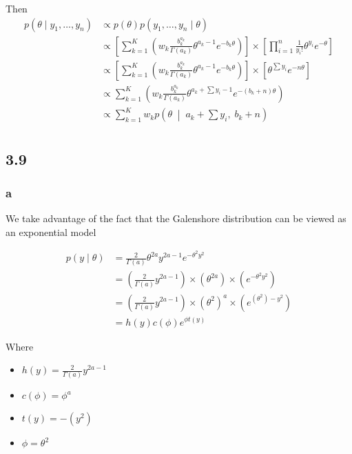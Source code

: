 \documentclass[]{article}
\providecommand{\tightlist}{%
  \setlength{\itemsep}{0pt}\setlength{\parskip}{0pt}}
\begin{document}
Then \begin{align}
p(\theta \mid y_1, \dots, y_n) &\propto p(\theta) p(y_1, \dots, y_n \mid \theta) \\
&\propto \left[ \sum_{k = 1}^K \left( w_k \frac{b_k^{a_k}}{\Gamma(a_k)} \theta^{a_k - 1} e^{-b_k \theta} \right) \right] \times \left[ \prod_{i = 1}^n \frac{1}{y_i !} \theta^{y_i} e^{-\theta} \right] \\
&\propto \left[ \sum_{k = 1}^K \left( w_k \frac{b_k^{a_k}}{\Gamma(a_k)} \theta^{a_k - 1} e^{-b_k \theta} \right) \right] \times \left[ \theta^{\sum y_i} e^{-n\theta} \right] \\
&\propto \sum_{k = 1}^K \left( w_k \frac{b_k^{a_k}}{\Gamma(a_k)} \theta^{a_k + \sum y_i - 1} e^{-(b_k + n)\theta} \right) \\
&\propto \sum_{k = 1}^K w_k p\left(\theta \; \middle| \; a_k + \sum y_i, \; b_k + n \right) \\
\end{align}

\hypertarget{section-5}{%
\subsection{3.9}\label{section-5}}

\hypertarget{a-4}{%
\subsubsection{a}\label{a-4}}

We take advantage of the fact that the Galenshore distribution can be
viewed as an exponential model

\begin{align}
p(y \mid \theta) &= \frac{2}{\Gamma(a)} \theta^{2a} y^{2a - 1} e^{-\theta^2 y^2} \\
&= \left( \frac{2}{\Gamma(a)} y^{2a - 1} \right) \times \left(\theta^{2a} \right) \times \left( e^{-\theta^2 y^2} \right) \\
&= \left( \frac{2}{\Gamma(a)} y^{2a - 1} \right) \times \left(\theta^2 \right)^a \times \left( e^{\left(\theta^2\right) -y^2} \right) \\
&= h(y) c(\phi) e^{\phi t(y)}
\end{align}

Where

\begin{itemize}
\tightlist
\item
  \(h(y) = \frac{2}{\Gamma(a)} y^{2a - 1}\)
\item
  \(c(\phi) = \phi^a\)
\item
  \(t(y) = -(y^2)\)
\item
  \(\phi = \theta^2\)
\end{itemize}
\end{document}
